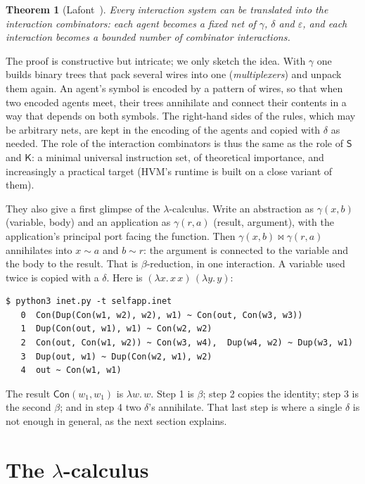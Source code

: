 \documentclass[11pt,a4paper]{article}
\newcommand{\ag}[1]{\mathsf{#1}}
\newcommand{\Con}{\ag{Con}}
\newcommand{\act}{\mathrel{\bowtie}}
\newcommand{\eqn}{\mathrel{\sim}}
\theoremstyle{definition}
\theoremstyle{plain}
\newtheorem{theorem}{Theorem}
\begin{document}
\begin{theorem}[Lafont~\cite{lafont97}]
Every interaction system can be translated into the interaction combinators:
each agent becomes a fixed net of $\gamma$, $\delta$ and $\varepsilon$, and
each interaction becomes a bounded number of combinator interactions.
\end{theorem}

\noindent
The proof is constructive but intricate; we only sketch the idea. With
$\gamma$ one builds binary trees that pack several wires into one
(\emph{multiplexers}) and unpack them again. An agent's symbol is encoded by a
pattern of wires, so that when two encoded agents meet, their trees
annihilate and connect their contents in a way that depends on both symbols.
The right-hand sides of the rules, which may be arbitrary nets, are kept in
the encoding of the agents and copied with $\delta$ as needed. The role of
the interaction combinators is thus the same as the role of $\ag{S}$ and
$\ag{K}$: a minimal universal instruction set, of theoretical importance, and
increasingly a practical target (HVM's runtime is built on a close variant
of them).

They also give a first glimpse of the $\lambda$-calculus. Write an abstraction
as $\gamma(x, b)$ (variable, body) and an application as $\gamma(r, a)$
(result, argument), with the application's principal port facing the
function. Then $\gamma(x,b) \act \gamma(r,a)$ annihilates into $x \eqn a$ and
$b \eqn r$: the argument is connected to the variable and the body to the
result. That is $\beta$-reduction, in one interaction. A variable used twice
is copied with a $\delta$. Here is $(\lambda x.\,x\,x)\,(\lambda y.\,y)$:
\begin{lstlisting}[style=trace]
$ python3 inet.py -t selfapp.inet
   0  Con(Dup(Con(w1, w2), w2), w1) ~ Con(out, Con(w3, w3))
   1  Dup(Con(out, w1), w1) ~ Con(w2, w2)
   2  Con(out, Con(w1, w2)) ~ Con(w3, w4),  Dup(w4, w2) ~ Dup(w3, w1)
   3  Dup(out, w1) ~ Dup(Con(w2, w1), w2)
   4  out ~ Con(w1, w1)
\end{lstlisting}
The result $\Con(w_1,w_1)$ is $\lambda w.\,w$. Step 1 is $\beta$; step 2
copies the identity; step 3 is the second $\beta$; and in step 4 two
$\delta$'s annihilate. That last step is where a single $\delta$ is not
enough in general, as the next section explains.

\section{The \texorpdfstring{$\lambda$}{lambda}-calculus}\label{sec:lambda}
\end{document}

